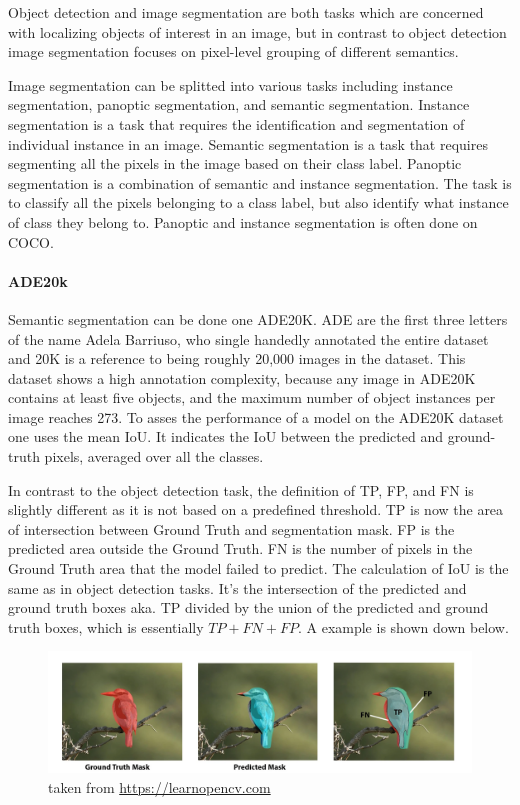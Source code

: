 \documentclass[
]{krantz}
\begin{document}
Object detection and image segmentation are both tasks which are concerned with localizing objects of interest in an image, but in contrast to object detection image segmentation focuses on pixel-level grouping of different semantics.

Image segmentation can be splitted into various tasks including instance segmentation, panoptic segmentation, and semantic segmentation. Instance segmentation is a task that requires the identification and segmentation of individual instance in an image. Semantic segmentation is a task that requires segmenting all the pixels in the image based on their class label. Panoptic segmentation is a combination of semantic and instance segmentation. The task is to classify all the pixels belonging to a class label, but also identify what instance of class they belong to. Panoptic and instance segmentation is often done on COCO.

\hypertarget{ade20k}{%
\paragraph{ADE20k}\label{ade20k}}

Semantic segmentation can be done one ADE20K\citep{zhou2017scene}. ADE are the first three letters of the name Adela Barriuso, who single handedly annotated the entire dataset and 20K is a reference to being roughly 20,000 images in the dataset. This dataset shows a high annotation complexity, because any image in ADE20K contains at least five objects, and the maximum number of object instances per image reaches 273. To asses the performance of a model on the ADE20K dataset one uses the mean IoU. It indicates the IoU between the predicted and ground-truth pixels, averaged over all the classes.

In contrast to the object detection task, the definition of TP, FP, and FN is slightly different as it is not based on a predefined threshold. TP is now the area of intersection between Ground Truth and segmentation mask. FP is the predicted area outside the Ground Truth. FN is the number of pixels in the Ground Truth area that the model failed to predict. The calculation of IoU is the same as in object detection tasks. It's the intersection of the predicted and ground truth boxes aka. TP divided by the union of the predicted and ground truth boxes, which is essentially \(TP + FN + FP\).
A example is shown down below.

\begin{figure}
\centering
\includegraphics{figures/01-chapter1/5-segmentation-iou.png}
\caption{taken from \url{https://learnopencv.com}}
\end{figure}
\end{document}
